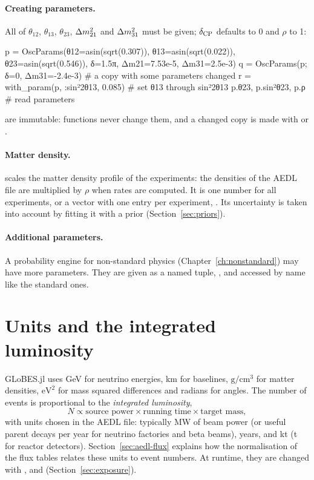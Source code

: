 \paragraph{Creating parameters.} All of $\theta_{12}$, $\theta_{13}$,
$\theta_{23}$, $\Delta m^2_{21}$ and $\Delta m^2_{31}$ must be given; $\delta_\mathrm{CP}$ defaults to 0 and
$\rho$ to 1:
\begin{julia}
p = OscParams(θ12=asin(sqrt(0.307)), θ13=asin(sqrt(0.022)), θ23=asin(sqrt(0.546)),
              δ=1.5π, Δm21=7.53e-5, Δm31=2.5e-3)
q = OscParams(p; δ=0, Δm31=-2.4e-3)       # a copy with some parameters changed
r = with_param(p, :sin²2θ13, 0.085)        # set θ13 through sin²2θ13
p.θ23, p.sin²θ23, p.ρ                     # read parameters
\end{julia}
 are immutable: functions never change them, and a changed copy
is made with  or .

\paragraph{Matter density.}  scales the matter density profile of the
experiments: the densities of the AEDL file are multiplied by $\rho$ when rates
are computed. It is one number for all experiments, or a vector with one entry
per experiment, . Its uncertainty is taken
into account by fitting it with a prior (Section~\ref{sec:priors}).

\paragraph{Additional parameters.} A probability engine for non-standard
physics (Chapter~\ref{ch:nonstandard}) may have more parameters. They are given
as a named tuple, , and accessed by name like
the standard ones.

\section{Units and the integrated luminosity}\label{sec:luminosity}

GLoBES.jl uses GeV for neutrino energies, km for baselines, $\mathrm{g/cm^3}$
for matter densities, $\mathrm{eV}^2$ for mass squared differences and radians
for angles. The number of events is proportional to the \emph{integrated
luminosity},
\begin{equation}
N \propto \text{source power} \times \text{running time} \times \text{target mass},
\end{equation}
with units chosen in the AEDL file: typically MW of beam power (or useful
parent decays per year for neutrino factories and beta beams), years, and kt
(t for reactor detectors). Section~\ref{sec:aedl-flux} explains how the
normalisation of the flux tables relates these units to event numbers. At
runtime, they are changed with ,  and
 (Section~\ref{sec:exposure}).


